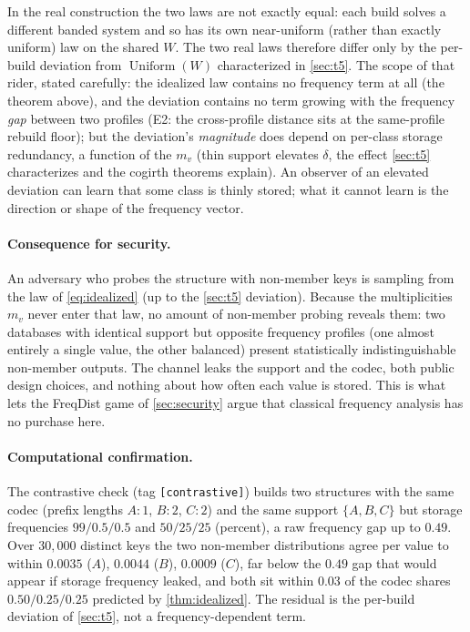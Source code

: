 \documentclass[sigconf,nonacm,anonymous,balance=false]{acmart}
\DeclareMathOperator{\Uniform}{Uniform}
\newcommand{\W}{W}                          %
\begin{document}
In the real construction the two laws are not exactly equal: each build solves a
different banded system and so has its own near-uniform (rather than exactly uniform)
law on the shared $\W$. The two real laws therefore differ only by the per-build
deviation from $\Uniform(\W)$ characterized in \cref{sec:t5}. The scope of that rider,
stated carefully: the idealized law contains no frequency term at all (the theorem
above), and the deviation contains no term growing with the frequency \emph{gap}
between two profiles (E2: the cross-profile distance sits at the same-profile rebuild
floor); but the deviation's \emph{magnitude} does depend on per-class storage
redundancy, a function of the $m_v$ (thin support elevates $\delta$, the effect
\cref{sec:t5} characterizes and the cogirth theorems explain). An observer of an
elevated deviation can learn that some class is thinly stored; what it cannot learn is
the direction or shape of the frequency vector.

\paragraph{Consequence for security.}
An adversary who probes the structure with non-member keys is sampling from the law of
\eqref{eq:idealized} (up to the \cref{sec:t5} deviation). Because the multiplicities
$m_v$ never enter that law, no amount of non-member probing reveals them: two databases
with identical support but opposite frequency profiles (one almost entirely a single
value, the other balanced) present statistically indistinguishable non-member outputs.
The channel leaks the support and the codec, both public design choices, and nothing
about how often each value is stored. This is what lets the FreqDist game of
\cref{sec:security} argue that classical frequency analysis has no purchase here.

\paragraph{Computational confirmation.}
The contrastive check (tag \texttt{[contrastive]}) builds two structures with the same
codec (prefix lengths $A{:}1$, $B{:}2$, $C{:}2$) and the same support $\{A,B,C\}$ but
storage frequencies $99/0.5/0.5$ and $50/25/25$ (percent), a raw frequency
gap up to $0.49$. Over $30{,}000$ distinct keys the two non-member distributions agree
per value to within $0.0035$ ($A$), $0.0044$ ($B$), $0.0009$ ($C$), far below the
$0.49$ gap that would appear if storage frequency leaked, and both sit within $0.03$ of
the codec shares $0.50 / 0.25 / 0.25$ predicted by \cref{thm:idealized}. The residual
is the per-build deviation of \cref{sec:t5}, not a frequency-dependent term.
\end{document}
